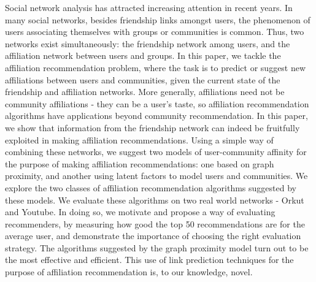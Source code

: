 Social network analysis has attracted increasing attention in recent years. In many social networks, besides friendship links amongst users, the phenomenon of users associating themselves with groups or communities is common. Thus, two networks exist simultaneously: the friendship network among users, and the affiliation network between users and groups. In this paper, we tackle the affiliation recommendation problem, where the task is to predict or suggest new affiliations between users and communities, given the current state of the friendship and affiliation networks. More generally, affiliations need not be community affiliations - they can be a user's taste, so affiliation recommendation algorithms have applications beyond community recommendation. In this paper, we show that information from the friendship network can indeed be fruitfully exploited in making affiliation recommendations. Using a simple way of combining these networks, we suggest two models of user-community affinity for the purpose of making affiliation recommendations: one based on graph proximity, and another using latent factors to model users and communities. We explore the two classes of affiliation recommendation algorithms suggested by these models. We evaluate these algorithms on two real world networks - Orkut and Youtube. In doing so, we motivate and propose a way of evaluating recommenders, by measuring how good the top 50 recommendations are for the average user, and demonstrate the importance of choosing the right evaluation strategy. The algorithms suggested by the graph proximity model turn out to be the most effective and efficient. This use of link prediction techniques for the purpose of affiliation recommendation is, to our knowledge, novel.
